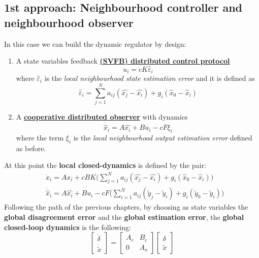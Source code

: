 \subsection{\color{red}1st approach: Neighbourhood controller and neighbourhood observer}
In this case we can build the dynamic regulator by design: 
\begin{enumerate}
    \item A state variables feedback \underline{\textbf{(SVFB) distributed control protocol}}
    \begin{equation*}
        u_i = cK\hat{\varepsilon}_i
    \end{equation*}
    where $\hat{\varepsilon}_i$ is the \textit{local neighbourhood state estimation error} and it is defined as 
    \begin{equation*}
        \hat{\varepsilon}_i = \sum_{j=1}^N a_{ij} (\hat{x_j}-\hat{x_i}) + g_i (\hat{x}_0 - \hat{x}_i)
    \end{equation*}
    \item A \textbf{\underline{cooperative distributed observer}} with dynamics
    \begin{equation*}
        \dot{\hat{x}}_i = A \hat{x_i} + B u_i - cF\xi_i
    \end{equation*}
    where the term $\xi_i$ is the \textit{local neighbourhood output estimation error} defined as before.
\end{enumerate}

\noindent
At this point the \textbf{local closed-dynamics} is defined by the pair:
\begin{align*}
    &\dot{x}_i = Ax_i + c B K \biggl(
        \sum_{j=1}^N a_{ij} (\hat{x_j}-\hat{x_i}) + g_i (\hat{x}_0 - \hat{x}_i)
    \biggr)\\
    &\dot{\hat{x}}_i = A \hat{x_i} + B u_i -cF\biggl(
        \sum_{i=1}^N a_{ij} (\tilde{y}_j - \tilde{y}_i) + g_i (\tilde{y}_0 - \tilde{y}_i)
    \biggr)
\end{align*}
Following the path of the previous chapters, by choosing as state variables the \textbf{global disagreement error} and the \textbf{global estimation error}, the  \textbf{global closed-loop dynamics} is the following: 
{\large{
    \begin{equation*}
        \begin{bmatrix}
            \dot{\delta}\\\dot{\tilde{x}} 
        \end{bmatrix} = \begin{bmatrix}
            A_c&B_c\\
            0&A_o
        \end{bmatrix}
        \begin{bmatrix}
            \delta\\\tilde{x}
        \end{bmatrix}
    \end{equation*}
}}


